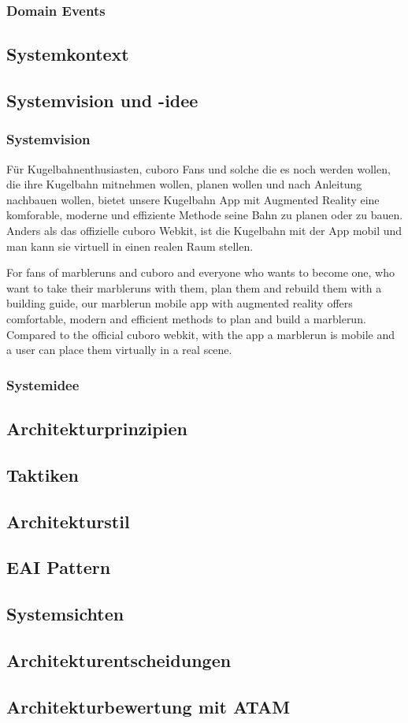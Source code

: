 \subsubsection{Domain Events}

\subsection{Systemkontext}
\subsection{Systemvision und -idee}
\subsubsection{Systemvision}

Für Kugelbahnenthusiasten, cuboro Fans und solche die es noch werden wollen,
die ihre Kugelbahn mitnehmen wollen, planen wollen und nach Anleitung nachbauen wollen,
bietet unsere Kugelbahn App
mit Augmented Reality
eine komforable, moderne und effiziente Methode seine Bahn zu planen oder zu bauen.
Anders als das offizielle cuboro Webkit,
ist die Kugelbahn mit der App mobil und man kann sie virtuell in einen realen Raum stellen.

For fans of marbleruns and cuboro and everyone who wants to become one,
who want to take their marbleruns with them, plan them and rebuild them with a building guide,
our marblerun mobile app
with augmented reality
offers comfortable, modern and efficient methods to plan and build a marblerun.
Compared to the official cuboro webkit,
with the app a marblerun is mobile and a user can place them virtually in a real scene.

\subsubsection{Systemidee}
\subsection{Architekturprinzipien}
\subsection{Taktiken}
\subsection{Architekturstil}
\subsection{EAI Pattern}
\subsection{Systemsichten}
\subsection{Architekturentscheidungen}
\subsection{Architekturbewertung mit ATAM}
